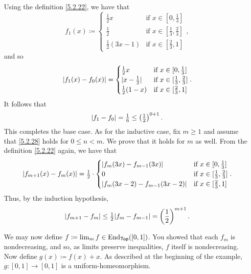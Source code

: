 \begin{exm}
Using the definition \eqref{5.2.22}, we have that
\begin{equation}
f_1(x)\coloneqq \begin{cases}\tfrac{1}{2}x & \text{if }x\in [0,\tfrac{1}{3}] \\ \tfrac{1}{2} & \text{if }x\in [\tfrac{1}{3},\tfrac{2}{3}] \\ \tfrac{1}{2}(3x-1) & \text{if }x\in [\tfrac{2}{3},1]\end{cases},
\end{equation}
and so
\begin{equation}
\left| f_1(x)-f_0(x)\right| =\begin{cases}\tfrac{1}{2}x & \text{if }x\in [0,\tfrac{1}{3}] \\ \lvert x-\tfrac{1}{2}\rvert & \text{if }x\in [\tfrac{1}{3},\tfrac{2}{3}] \\ \tfrac{1}{2}(1-x) & \text{if }x\in [\tfrac{2}{3},1]\end{cases}.
\end{equation}
It follows that
\begin{equation}
\norm[f_1-f_0]=\tfrac{1}{6}\leq \left( \tfrac{1}{2}\right) ^{0+1}.
\end{equation}
This completes the base case.  As for the inductive case, fix $m\geq 1$ and assume that \eqref{5.2.28} holds for $0\leq n<m$.  We prove that it holds for $m$ as well.  From the definition \eqref{5.2.22} again, we have that
\begin{equation}
\lvert f_{m+1}(x)-f_m(x)\rvert=\tfrac{1}{2}\cdot \begin{cases}\lvert f_m(3x)-f_{m-1}(3x)\rvert & \text{if }x\in [0,\tfrac{1}{3}] \\ 0 & \text{if }x\in [\tfrac{1}{3},\tfrac{2}{3}] \\ \lvert f_m(3x-2)-f_{m-1}(3x-2)\rvert & \text{if }x\in [\tfrac{2}{3},1]\end{cases}.
\end{equation}
Thus, by the induction hypothesis,
\begin{equation}
\norm[f_{m+1}-f_m]\leq \tfrac{1}{2}\norm[f_m-f_{m-1}]=\left( \frac{1}{2}\right) ^{m+1}.
\end{equation}

We may now define $f\coloneqq \lim _mf\in \operatorname{End} _{\mathsf{Top}}([0,1])$.  You showed that each $f_m$ is nondecreasing, and so, as limits preserve inequalities, $f$ itself is nondecreasing.  Now define $g(x)\coloneqq f(x)+x$.  As described at the beginning of the example, $g:[0,1]\rightarrow [0,1]$ is a uniform-homeomorphism.


\end{exm}
